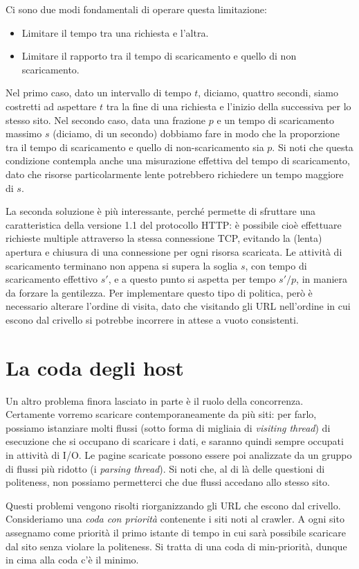 Ci sono due modi fondamentali di operare questa limitazione:
\begin{itemize}
    \item Limitare il tempo tra una richiesta e l'altra.
    \item Limitare il rapporto tra il tempo di scaricamento e quello di non scaricamento.
\end{itemize}
Nel primo caso, dato un intervallo di tempo $t$, diciamo, quattro secondi, siamo costretti ad aspettare $t$ tra la fine di una richiesta e l'inizio della successiva per lo stesso sito. Nel secondo caso, data una frazione $p$ e un tempo di scaricamento massimo $s$ (diciamo, di un secondo) dobbiamo fare in modo che la proporzione tra il tempo di scaricamento e quello di non-scaricamento sia $p$. Si noti che questa condizione contempla anche una misurazione effettiva del tempo di scaricamento, dato che risorse particolarmente lente potrebbero richiedere un tempo maggiore di $s$.

La seconda soluzione è più interessante, perché permette di sfruttare una caratteristica della versione 1.1 del protocollo HTTP: è possibile cioè effettuare richieste multiple attraverso la stessa connessione TCP, evitando la (lenta) apertura e chiusura di una connessione per ogni risorsa scaricata. Le attività di scaricamento terminano non appena si supera la soglia $s$, con tempo di scaricamento effettivo $s'$, e a questo punto si aspetta per tempo $s'/p$, in maniera da forzare la gentilezza.
Per implementare questo tipo di politica, però è necessario alterare l'ordine di visita, dato che visitando gli URL nell'ordine in cui escono dal crivello si potrebbe incorrere in attese a vuoto consistenti.
\section{La coda degli host}
Un altro problema finora lasciato in parte è il ruolo della concorrenza. Certamente vorremo scaricare contemporaneamente da più siti: per farlo, possiamo istanziare molti flussi (sotto forma di migliaia di \textit{visiting thread}) di esecuzione che si occupano di scaricare i dati, e saranno quindi sempre occupati in attività di I/O. Le pagine scaricate possono essere poi analizzate da un gruppo di flussi più ridotto (i \textit{parsing thread}). Si noti che, al di là delle questioni di politeness, non possiamo permetterci che due flussi accedano allo stesso sito.

Questi problemi vengono risolti riorganizzando gli URL che escono dal crivello. Consideriamo una \textit{coda con priorità} contenente i siti noti al crawler. A ogni sito assegnamo come priorità il primo istante di tempo in cui sarà possibile scaricare dal sito senza violare la politeness. Si tratta di una coda di min-priorità, dunque in cima alla coda c'è il minimo.

